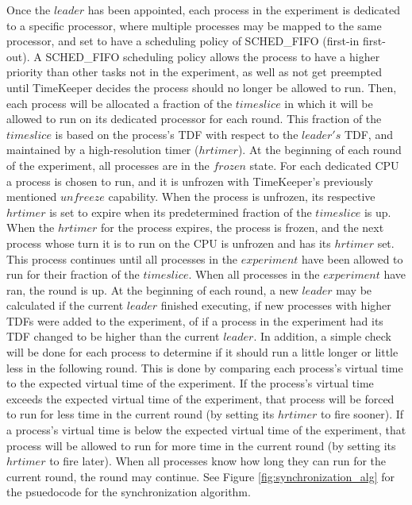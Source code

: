         Once the $leader$ has been appointed, each process in the experiment is dedicated to a specific processor, where multiple processes may be mapped to the same processor, and set to have a scheduling policy of SCHED\_FIFO (first-in first-out). A SCHED\_FIFO scheduling policy allows the process to have a higher priority than other tasks not in the experiment, as well as not get preempted until TimeKeeper decides the process should no longer be allowed to run. Then, each process will be allocated a fraction of the $timeslice$ in which it will be allowed to run on its dedicated processor for each round. This fraction of the $timeslice$ is based on the process's TDF with respect to the $leader's$ TDF, and maintained by a high-resolution timer ($hrtimer$). At the beginning of each round of the experiment, all processes are in the $frozen$ state. For each dedicated CPU a process is chosen to run, and it is unfrozen with TimeKeeper's previously mentioned $unfreeze$ capability. When the process is unfrozen, its respective $hrtimer$ is set to expire when its predetermined fraction of the $timeslice$ is up. When the $hrtimer$ for the process expires, the process is frozen, and the next process whose turn it is to run on the CPU is unfrozen and has its $hrtimer$ set. This process continues until all processes in the $experiment$ have been allowed to run for their fraction of the $timeslice$. When all processes in the $experiment$ have ran, the round is up. At the beginning of each round, a new $leader$ may be calculated if the current $leader$ finished executing, if new processes with higher TDFs were added to the experiment, of if a process in the experiment had its TDF changed to be higher than the current $leader$. In addition, a simple check will be done for each process to determine if it should run a little longer or little less in the following round. This is done by comparing each process's virtual time to the expected virtual time of the experiment. If the process's virtual time exceeds the expected virtual time of the experiment, that process will be forced to run for less time in the current round (by setting its $hrtimer$ to fire sooner). If a process's virtual time is below the expected virtual time of the experiment, that process will be allowed to run for more time in the current round (by setting its $hrtimer$ to fire later). When all processes know how long they can run for the current round, the round may continue. See Figure \ref {fig:synchronization_alg} for the psuedocode for the synchronization algorithm.
